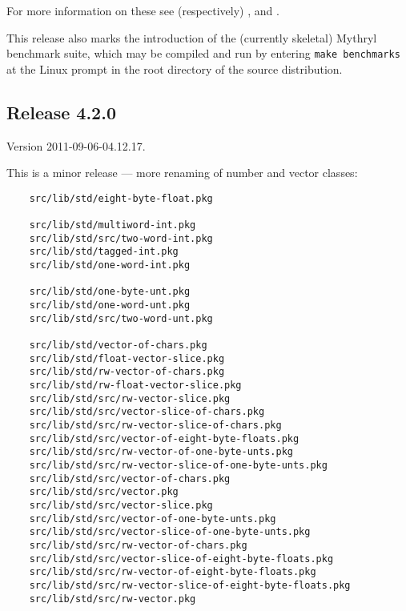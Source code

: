 For more information on these see (respectively) 
, 
 and 
. 

This release also marks the introduction of the (currently skeletal) Mythryl benchmark 
suite, which may be compiled and run by entering {\tt make benchmarks} at the Linux 
prompt in the root directory of the source distribution. 

\cutend*




\subsection{Release 4.2.0}
\label{section:src:release-4.2.0}

Version 2011-09-06-04.12.17.

This is a minor release --- more renaming of number and vector classes:

\begin{verbatim}
    src/lib/std/eight-byte-float.pkg

    src/lib/std/multiword-int.pkg
    src/lib/std/src/two-word-int.pkg
    src/lib/std/tagged-int.pkg
    src/lib/std/one-word-int.pkg

    src/lib/std/one-byte-unt.pkg
    src/lib/std/one-word-unt.pkg
    src/lib/std/src/two-word-unt.pkg

    src/lib/std/vector-of-chars.pkg
    src/lib/std/float-vector-slice.pkg
    src/lib/std/rw-vector-of-chars.pkg
    src/lib/std/rw-float-vector-slice.pkg
    src/lib/std/src/rw-vector-slice.pkg
    src/lib/std/src/vector-slice-of-chars.pkg
    src/lib/std/src/rw-vector-slice-of-chars.pkg
    src/lib/std/src/vector-of-eight-byte-floats.pkg
    src/lib/std/src/rw-vector-of-one-byte-unts.pkg
    src/lib/std/src/rw-vector-slice-of-one-byte-unts.pkg
    src/lib/std/src/vector-of-chars.pkg
    src/lib/std/src/vector.pkg
    src/lib/std/src/vector-slice.pkg
    src/lib/std/src/vector-of-one-byte-unts.pkg
    src/lib/std/src/vector-slice-of-one-byte-unts.pkg
    src/lib/std/src/rw-vector-of-chars.pkg
    src/lib/std/src/vector-slice-of-eight-byte-floats.pkg
    src/lib/std/src/rw-vector-of-eight-byte-floats.pkg
    src/lib/std/src/rw-vector-slice-of-eight-byte-floats.pkg
    src/lib/std/src/rw-vector.pkg
\end{verbatim}

